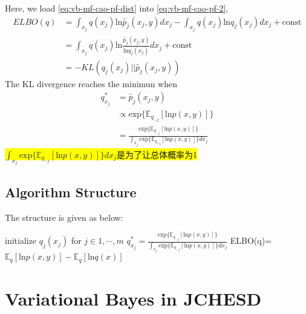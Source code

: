 \documentclass{article}
\begin{document}
Here, we load \eqref{eq:vb-mf-cao-pf-dist} into \eqref{eq:vb-mf-cao-pf-2},
\begin{align}
ELBO(q) &= \int_{x_j}q(x_j)\text{ln}\tilde{p_j}(x_j,y)dx_j - \int_{x_j}q(x_j)\text{ln} q_j(x_j)dx_j + \text{const} \\
&= \int_{x_j}q(x_j)\text{ln}\frac{\tilde{p_j}(x_j,y)}{\text{ln} q_j(x_j)}dx_j+ \text{const} \\
&= -KL(q_j(x_j) || \tilde{p_j}(x_j,y))
\end{align}
The KL divergence reaches the minimun when 
\begin{equation}
\begin{split}
q_{x_j}^* &= \tilde{p_j}(x_j,y) \\
& \propto \text{exp}\{ \mathbb{E}_{q_{-j}}[\text{ln}p(x,y)] \} \\
&= \frac{\text{exp}\{ \mathbb{E}_{q_{-j}}[\text{ln}p(x,y)] \} }{\int_{x_j} \text{exp}\{ \mathbb{E}_{q_{-j}}[\text{ln}p(x,y)] \} dx_j}
\end{split}
\end{equation}
\colorbox{yellow}{$\int_{x_j} \text{exp}\{ \mathbb{E}_{q_{-j}}[\text{ln}p(x,y)] \} dx_j$是为了让总体概率为1}
\subsection{Algorithm Structure}
The structure is given as below:
\begin{breakablealgorithm}
	\begin{algorithmic}[1] %
		\State initialize $q_j(x_j)$ for $j\in{1,\cdots,m}$
				\State $q_{x_j}^*= \frac{\text{exp}\{ \mathbb{E}_{q_{-j}}[\text{ln}p(x,y)] \} }{\int_{x_j} \text{exp}\{ \mathbb{E}_{q_{-j}}[\text{ln}p(x,y)] \} dx_j}$
			\EndFor
			\State ELBO(q)= $\mathbb{E}_q[\text{ln}p(x,y)] - \mathbb{E}_q [\text{ln} q(x)] $
		\EndWhile
		\State {}
	\end{algorithmic}
\end{breakablealgorithm}

\section{Variational Bayes in JCHESD}

\newpage


\end{document}
